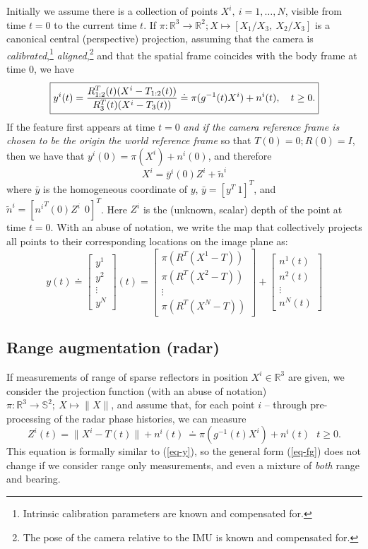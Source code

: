 \documentclass[]{article}
\newcommand{\ba}{\left[ \begin{array}}
\newcommand{\ea}{\end{array} \right]}
\def\real{\mathbb{R}}
\begin{document}
Initially we assume there is a collection of points $X^i, \ i = 1, \dots, N$, visible from time $t=0$ to the current time $t$. If $\pi:\real^3 \rightarrow \real^2; X \mapsto [X_1/X_3, \ X_2/X_3]$ is a canonical central (perspective) projection, assuming that the camera is {\em calibrated},\footnote{Intrinsic calibration parameters are known and compensated for.} {\em aligned},\footnote{The pose of the camera relative to the IMU is known and compensated for.} and that the spatial frame coincides with the body frame at time $0$, we have
\begin{equation}
\boxed{y^i(t) = {\color{black} \frac{R^T_{1:2}(t) (X^i - T_{1:2}(t))}{R^T_{3}(t)( X^i - T_3(t))}} \doteq  \pi(g^{-1}(t)X^i) + n^i(t), ~~~ {\color{black} t \ge 0.}}
\label{eq-y}
\end{equation}
If the feature first appears at time $t = 0$ {\em and if the camera reference frame is chosen to be the origin the world reference frame} so that $T(0) = 0; R(0) = I$, then we have that $y^i(0) = \pi(X^i) +n^i(0)$, and therefore
\begin{equation}
\boxed{X^i = \bar y^i(0)Z^i + \tilde n^i}
\label{eq-trian}
\end{equation}
where $\bar y$ is the homogeneous coordinate of $y$, $\bar y = [y^T \ 1]^T$, and $\tilde n^i = [{n^i}^T(0)Z^i \ \  0]^T$. Here $Z^i$ is the (unknown, scalar) depth of the point at time $t = 0$. With an abuse of notation, we write the map that collectively projects all points to their corresponding locations on the image plane as:
\begin{equation}
y(t) \doteq \ba{c}
y^1 \\ y^2 \\ \vdots \\ y^N \ea (t)
 = \ba{c}
\pi(R^T(X^1 - T)) \\
\pi(R^T(X^2- T)) \\
\vdots\\
\pi(R^T( X^N- T))
\ea
+ \ba{c}
n^1(t) \\ n^2(t) \\ \vdots \\ n^N(t) \ea 
\label{eq-vis}
\end{equation}


\subsection{Range augmentation (radar)}

If measurements of range of sparse reflectors in position $X^i \in \real^3$ are given, we consider the projection function (with an abuse of notation) $\pi: \real^3 \rightarrow {\mathbb S}^2; \ X \mapsto \| X \|$, and assume that, for each point $i$ -- through pre-processing of the radar phase histories, we can measure
\begin{equation}
\boxed{Z^i(t) = \| X^i - T(t) \| + n^i(t) ~  \doteq \pi(g^{-1}(t)X^i) + n^i(t) ~~~ t \ge 0.}
\end{equation}
This equation is formally similar to (\ref{eq-y}), so the general form (\ref{eq-fg}) does not change if we consider range only measurements, and even a mixture of {\em both} range and bearing. 
\end{document}
